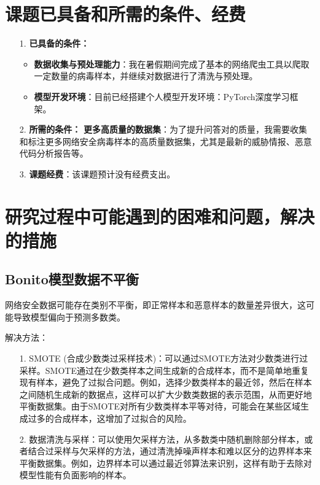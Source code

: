 \section{课题已具备和所需的条件、经费}
\begin{itemize}
    \item[1.] \textbf{已具备的条件：}
        \begin{itemize}
            \item \textbf{数据收集与预处理能力}：我在暑假期间完成了基本的网络爬虫工具以爬取一定数量的病毒样本，并继续对数据进行了清洗与预处理。
            \item \textbf{模型开发环境}：目前已经搭建个人模型开发环境：PyTorch深度学习框架。
        \end{itemize}
    \item[2.]\textbf{所需的条件：}
         \textbf{更多高质量的数据集}：为了提升问答对的质量，我需要收集和标注更多网络安全病毒样本的高质量数据集，尤其是最新的威胁情报、恶意代码分析报告等。
    \item[3.]\textbf{课题经费}：该课题预计没有经费支出。
\end{itemize}

\section{研究过程中可能遇到的困难和问题，解决的措施}
\subsection{Bonito模型数据不平衡}
网络安全数据可能存在类别不平衡，即正常样本和恶意样本的数量差异很大，这可能导致模型偏向于预测多数类。

解决方法：
\begin{itemize}
    \item[1.] SMOTE\cite{10.5555/1622407.1622416}
        (合成少数类过采样技术)：可以通过SMOTE方法对少数类进行过采样。SMOTE通过在少数类样本之间生成新的合成样本，而不是简单地重复现有样本，避免了过拟合问题。例如，选择少数类样本的最近邻\cite{2005Borderline}，然后在样本之间随机生成新的数据点，这样可以扩大少数类数据的表示范围，从而更好地平衡数据集。由于SMOTE对所有少数类样本平等对待，可能会在某些区域生成过多的合成样本，这增加了过拟合的风险。
    \item[2.] 数据清洗与采样：可以使用欠采样方法\cite{Krawczyk2016LearningFI}，从多数类中随机删除部分样本，或者结合过采样与欠采样的方法，通过清洗掉噪声样本和难以区分的边界样本来平衡数据集。例如，边界样本可以通过最近邻算法来识别，这样有助于去除对模型性能有负面影响的样本​。
\end{itemize}

